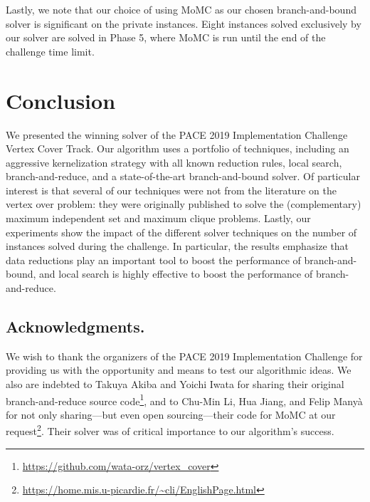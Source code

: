 \documentclass[twoside,leqno,twocolumn]{article}
\begin{document}
Lastly, we note that our choice of using MoMC as our chosen branch-and-bound solver is significant on the private instances. Eight instances solved exclusively by our solver are solved in Phase 5, where MoMC is run until the end of the challenge time limit.

\iffalse %
\begin{figure}
    \centering
    
  \caption{Time required for each solver over graph density.} 
  \label{fig:solution_time}
\end{figure}
\fi{}

\section{Conclusion}
We presented the winning solver of the PACE 2019 Implementation Challenge Vertex Cover Track. Our algorithm uses a portfolio of techniques, including an aggressive kernelization strategy with all known reduction rules, local search, branch-and-reduce, and a state-of-the-art branch-and-bound solver. Of particular interest is that several of our techniques were not from the literature on the vertex over problem: they were originally published to solve the (complementary) maximum independent set and maximum clique problems. Lastly, our experiments show the impact of the different solver techniques on the number of instances solved during the challenge. In particular, the results emphasize that data reductions play an important tool to boost the performance of branch-and-bound, and local search is highly effective to boost the performance of branch-and-reduce.

\subsection*{Acknowledgments.}
We wish to thank the organizers of the PACE 2019 Implementation Challenge for providing us with the opportunity and means to test our algorithmic ideas. We also are indebted to Takuya Akiba and  Yoichi Iwata for sharing their original branch-and-reduce source code\footnote{\url{https://github.com/wata-orz/vertex_cover}}, and to Chu-Min Li, Hua Jiang, and Felip Many\`a for not only sharing---but even open sourcing---their code for MoMC at our request\footnote{\url{https://home.mis.u-picardie.fr/~cli/EnglishPage.html}}. Their solver was of critical importance to our algorithm's success.




\vfill
\end{document}
